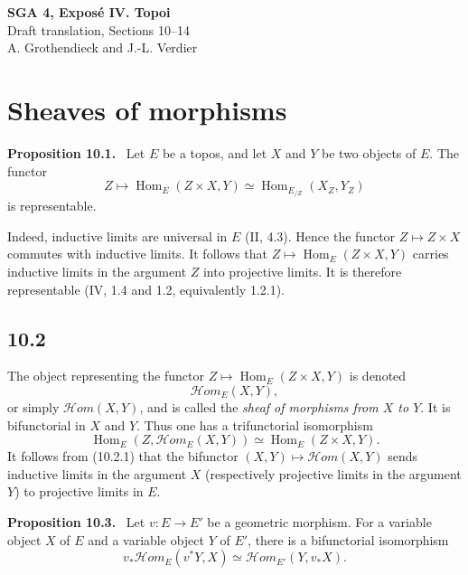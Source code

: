 \documentclass[11pt]{article}
\newcommand{\Hom}{\operatorname{Hom}}
\newcommand{\scrHom}{\mathscr{H}\!om}
\newenvironment{statement}[1]{\par\medskip\noindent\textbf{#1.}\ }{\par\medskip}
\begin{document}
\begin{center}
{\Large \textbf{SGA 4, Expos\'e IV. Topoi}}\\[0.35em]
{\large Draft translation, Sections 10--14}\\[0.35em]
A. Grothendieck and J.-L. Verdier
\end{center}

\bigskip


\setcounter{section}{9}
\section{Sheaves of morphisms}

\begin{statement}{Proposition 10.1}
Let $E$ be a topos, and let $X$ and $Y$ be two objects of $E$. The functor
\[
Z\longmapsto \Hom_E(Z\times X,Y)\simeq \Hom_{E_{/Z}}(X_Z,Y_Z)
\]
is representable.
\end{statement}

Indeed, inductive limits are universal in $E$ (II, 4.3). Hence the functor $Z\mapsto Z\times X$ commutes with inductive limits. It follows that $Z\mapsto \Hom_E(Z\times X,Y)$ carries inductive limits in the argument $Z$ into projective limits. It is therefore representable (IV, 1.4 and 1.2, equivalently 1.2.1).

\subsection*{10.2}
The object representing the functor $Z\mapsto \Hom_E(Z\times X,Y)$ is denoted
\[
\scrHom_E(X,Y),
\]
or simply $\scrHom(X,Y)$, and is called the \emph{sheaf of morphisms from $X$ to $Y$}. It is bifunctorial in $X$ and $Y$. Thus one has a trifunctorial isomorphism
\begin{equation}
\Hom_E(Z,\scrHom_E(X,Y))\simeq \Hom_E(Z\times X,Y).\tag{10.2.1}
\end{equation}
It follows from (10.2.1) that the bifunctor $(X,Y)\mapsto \scrHom(X,Y)$ sends inductive limits in the argument $X$ (respectively projective limits in the argument $Y$) to projective limits in $E$.

\begin{statement}{Proposition 10.3}
Let $v:E\to E'$ be a geometric morphism. For a variable object $X$ of $E$ and a variable object $Y$ of $E'$, there is a bifunctorial isomorphism
\begin{equation}
v_*\scrHom_E(v^*Y,X)\simeq \scrHom_{E'}(Y,v_*X).\tag{10.3.1}
\end{equation}
\end{statement}
\end{document}
